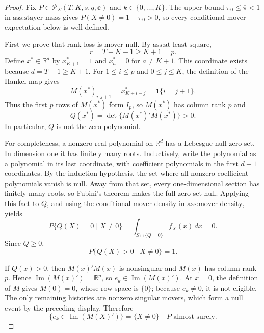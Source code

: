 \documentclass{article}
\begin{document}
\begin{proof}
Fix \(P\in\mathcal P_\Sigma(T,K,s,q,\mathbf c)\) and \(k\in\{0,\ldots,K\}\). The upper bound \(\pi_0\le\overline\pi<1\) in \(\text{ass:stayer-mass}\) gives \(P(X\ne0)=1-\pi_0>0\), so every conditional mover expectation below is well defined.

First we prove that rank loss is mover-null. By \(\text{ass:at-least-square}\),
\[
r=T-K-1\ge K+1=p.
\]
Define \(x^*\in\mathbb R^d\) by \(x^*_{K+1}=1\) and \(x^*_a=0\) for \(a\ne K+1\). This coordinate exists because \(d=T-1\ge K+1\). For \(1\le i\le p\) and \(0\le j\le K\), the definition of the Hankel map gives
\[
M(x^*)_{i,j+1}=x^*_{K+i-j}=\mathbf 1\{i=j+1\}.
\]
Thus the first \(p\) rows of \(M(x^*)\) form \(I_p\), so \(M(x^*)\) has column rank \(p\) and
\[
Q(x^*)=\det\{M(x^*)'M(x^*)\}>0.
\]
In particular, \(Q\) is not the zero polynomial.

For completeness, a nonzero real polynomial on \(\mathbb R^d\) has a Lebesgue-null zero set. In dimension one it has finitely many roots. Inductively, write the polynomial as a polynomial in its last coordinate, with coefficient polynomials in the first \(d-1\) coordinates. By the induction hypothesis, the set where all nonzero coefficient polynomials vanish is null. Away from that set, every one-dimensional section has finitely many roots, so Fubini's theorem makes the full zero set null. Applying this fact to \(Q\), and using the conditional mover density in \(\text{ass:mover-density}\), yields
\[
P\{Q(X)=0\mid X\ne0\}
=\int_{S\cap\{Q=0\}}f_X(x)\,dx=0.
\]
Since \(Q\ge0\),
\[
P\{Q(X)>0\mid X\ne0\}=1.
\]

If \(Q(x)>0\), then \(M(x)'M(x)\) is nonsingular and \(M(x)\) has column rank \(p\). Hence \(\operatorname{Im}(M(x)')=\mathbb R^p\), so \(e_k\in\operatorname{Im}(M(x)')\). At \(x=0\), the definition of \(M\) gives \(M(0)=0\), whose row space is \(\{0\}\); because \(e_k\ne0\), it is not eligible. The only remaining histories are nonzero singular movers, which form a null event by the preceding display. Therefore
\[
\{e_k\in\operatorname{Im}(M(X)')\}
=\{X\ne0\}
\quad P\text{-almost surely}.
\]


\end{proof}
\end{document}
